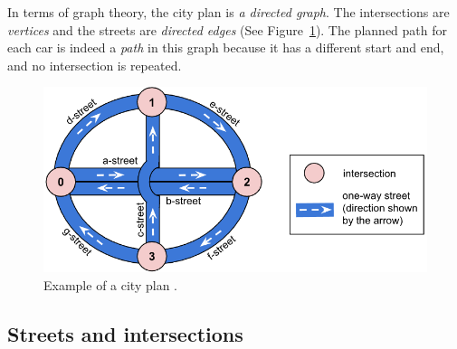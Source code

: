 
In terms of graph theory, the city plan is \textit{a directed graph}. The intersections are \textit{vertices} and the streets are \textit{directed edges} (See Figure~\ref{fig:hashcode_city_plan}). The planned path for each car is indeed a \textit{path} in this graph because it has a different start and end, and no intersection is repeated.

\begin{figure}
    \centering
    \includegraphics[width=\linewidth]{img/hashcode/figure1.png}
    \caption[Example of a city plan]{
        Example of a city plan \cite{google_coding_competitions}.
    }
    \label{fig:hashcode_city_plan}
\end{figure}

\subsection{Streets and intersections}



